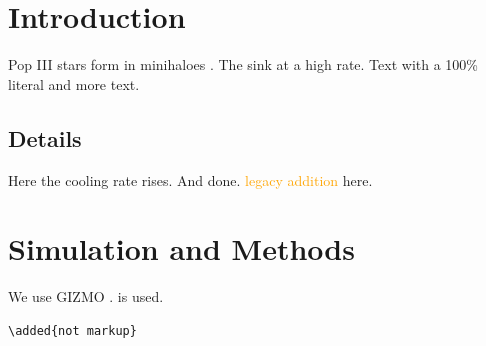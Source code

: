 \documentclass{article}
\newcommand{\skadd}[1]{{\textcolor{orange}{#1}}}
\begin{document}
\begin{abstract}
We study  discs.
\end{abstract}

\section{Introduction}\label{sec:intro}
Pop III stars form in minihaloes \citep{abel02}.
The sink  at a high rate.
Text with a 100\% literal and %
more text.

\subsection{Details}
Here the cooling rate rises. %
And  done.
\skadd{legacy addition} here.

\section{Simulation and Methods}
We use GIZMO . %
 is used.

\begin{verbatim}
\added{not markup}
\end{verbatim}
\end{document}
